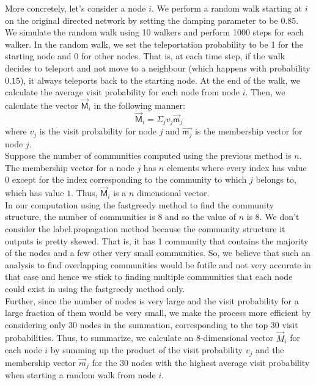 \documentclass{article}
\newcommand{\m}{\mathsf{m}}
\newcommand{\M}{\mathsf{M}}
\begin{document}
More concretely, let's consider a node $i$. We perform a random walk starting at $i$ on the original directed network
by setting the damping parameter to be $0.85$. We simulate the random walk using 10 walkers and perform 1000 steps for each
walker. In the random walk, we set the teleportation probability to be 1 for the starting node and 0 for other 
nodes. That is, at each time step, if the walk decides to teleport and not move to a neighbour (which happens with probability
$0.15$), it always teleports back to the starting node.
At the end of the walk, we calculate the average visit probability for each node from node $i$.
Then, we calculate the vector $\vec{\M}_i$ in the following manner:\\
$$\vec{\M}_i = \Sigma_j v_j\vec{\m}_j$$
where $v_j$ is the visit probability for node $j$ and $\vec{\m_j}$ is the membership vector for node $j$.\\
Suppose the number of communities computed using the previous method is $n$.
The membership vector for a node $j$ has $n$ elements where every index has value 0 except for the index
corresponding to the community to which $j$ belongs to, which has value $1$.
Thus, $\vec{\M}_i$ is a $n$ dimensional vector.\\

In our computation using the fastgreedy method to find the community structure, the number of communities is 8 and so the 
value of $n$ is 8. We don't consider the label.propagation method because the community structure it outputs is pretty skewed.
That is, it has 1 community that contains the majority of the nodes and a few other very small communities. So, we believe that such
an analysis to find overlapping communities would be futile and not very accurate in that case and hence we stick
to finding multiple communities that each node could exist in using the fastgreedy method only.\\

Further, since the number of nodes is very large and the visit probability for a large fraction of them would be very small,
we make the process more efficient by considering only 30 nodes in the summation, corresponding to the top 30 visit
probabilities. Thus, to summarize, we calculate an 8-dimensional vector $\vec{M}_i$ for each node $i$ by summing up 
the product of the visit probability $v_j$ and the membership vector $\vec{m}_j$ for the 30 nodes with the highest average visit
probability when starting a random walk from node $i$.\\
\end{document}
